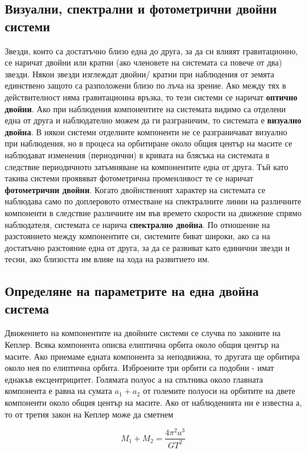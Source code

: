 \documentclass[a4paper,12pt]{article}
\begin{document}
\subsection{Визуални, спектрални и фотометрични двойни системи}
Звезди, които са достатъчно близо една до друга, за да си влияят гравитационно, се наричат двойни или кратни (ако членовете на системата са повече от два) звезди. Някои звезди изглеждат двойни/ кратни при наблюдения от земята единствено защото са разположени близо по лъча на зрение. Ако между тях в действителност няма гравитационна връзка, то тези системи се наричат \textbf{оптично двойни}. Ако при наблюдения компонентите на системата видимо са отделени една от друга и наблюдателно можем да ги разграничим, то системата е \textbf{визуално двойна}. В някои системи отделните компоненти не се разграничават визуално при наблюдения, но в процеса на орбитиране около общия център на масите се наблюдават изменения (периодични) в кривата на блясъка на системата в следствие периодичното затъмняване на компонентите една от друга. Тъй като такива системи проявяват фотометрична променливост те се наричат \textbf{фотометрични двойни}.  Когато двойнственият характер на системата се наблюдава само по доплеровото отместване на спектралните линии на различните компоненти в следствие различните им във времето скорости на движение спрямо наблюдателя, системата се нарича \textbf{спектрално двойна}. По отношение на разстоянието между компонентите си, системите биват широки, ако са на достатъчно разстояние една от друга, за да се развиват като единични звезди и тесни, ако близостта им влияе на хода на развитието им.

\subsection{Определяне на параметрите на една двойна система}
Движението на компонентите на двойните системи се случва по законите на Кеплер. Всяка компонента описва елиптична орбита около общия център на масите. Ако приемаме едната компонента за неподвижна, то другата ще орбитира около нея по елиптична орбита. Изброените три орбити са подобни - имат еднакъв ексцентрицитет. Голямата полуос $а$ на спътника около главната компонента е равна на сумата $a_1 + a_2$ от големите полуоси на орбитите на двете компоненти около общия център на масите. Ако от наблюденията ни е известна $а$, то от третия закон на Кеплер може да сметнем

\begin{equation}
    M_1 + M_2 = \frac{4\pi^2 a^3}{GT^2}
\end{equation}
\end{document}
